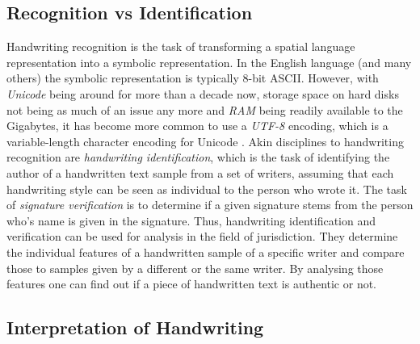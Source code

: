 
\subsection{Recognition vs Identification}
\label{sec:recognitionvsidentification}

Handwriting recognition is the task of transforming a spatial language 
representation into a symbolic representation. In the English language
(and many others) the symbolic representation is typically 8-bit ASCII.
However, with \emph{Unicode} being around for more than a decade now,
storage space on hard disks not being as much of an issue any more and
\emph{RAM} being readily available to the Gigabytes, it has become more 
common to use a \emph{UTF-8}  encoding, which is a variable-length character 
encoding for Unicode .
Akin disciplines to handwriting recognition are 
\emph{handwriting identification}, which is the task of identifying the author
of a handwritten text sample from a set of writers, assuming that each
handwriting style can be seen as individual to the person who wrote it.
The task of \emph{signature verification} is to determine if a given signature
stems from the person who's name is given in the signature.
Thus, handwriting identification and verification can be used for 
analysis in the field of jurisdiction. They determine the individual features
of a handwritten sample of a specific writer and compare those
to samples given by a different or the same writer. By analysing those 
features one can find out if a piece of handwritten text is authentic or not.

\subsection{Interpretation of Handwriting}
\label{sec:interpretationofhandwriting}

